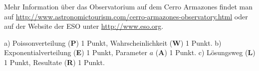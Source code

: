 \begin{diskussion}
Mehr Information über das Observatorium auf dem Cerro Armazones
findet man auf \url{http://www.astronomictourism.com/cerro-armazones-observatory.html} oder auf der Website der ESO unter \url{http://www.eso.org}.
\end{diskussion}

\begin{bewertung}
a) Poissonverteilung ({\bf P}) 1 Punkt, Wahrscheinlichkeit ({\bf W}) 1 Punkt.
b) Exponentialverteilung ({\bf E}) 1 Punkt, Parameter $a$ ({\bf A}) 1 Punkt.
c) Lösungsweg ({\bf L}) 1 Punkt, Resultate ({\bf R}) 1 Punkt.
\end{bewertung}
